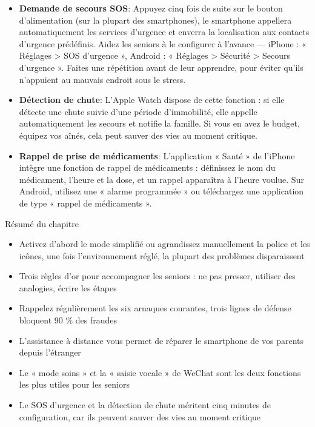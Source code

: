 
\begin{itemize}
  \item \textbf{Demande de secours SOS}: Appuyez cinq fois de suite sur le bouton d'alimentation (sur la plupart des smartphones), le smartphone appellera automatiquement les services d'urgence et enverra la localisation aux contacts d'urgence prédéfinis. Aidez les seniors à le configurer à l'avance — iPhone : « Réglages > SOS d'urgence », Android : « Réglages > Sécurité > Secours d'urgence ». Faites une répétition avant de leur apprendre, pour éviter qu'ils n'appuient au mauvais endroit sous le stress.
  \item \textbf{Détection de chute}: L'Apple Watch dispose de cette fonction : si elle détecte une chute suivie d'une période d'immobilité, elle appelle automatiquement les secours et notifie la famille. Si vous en avez le budget, équipez vos aînés, cela peut sauver des vies au moment critique.
  \item \textbf{Rappel de prise de médicaments}: L'application « Santé » de l'iPhone intègre une fonction de rappel de médicaments : définissez le nom du médicament, l'heure et la dose, et un rappel apparaîtra à l'heure voulue. Sur Android, utilisez une « alarme programmée » ou téléchargez une application de type « rappel de médicaments ».
\end{itemize}

\begin{tcbsummary}{Résumé du chapitre}
\begin{itemize}
  \item Activez d'abord le mode simplifié ou agrandissez manuellement la police et les icônes, une fois l'environnement réglé, la plupart des problèmes disparaissent
  \item Trois règles d'or pour accompagner les seniors : ne pas presser, utiliser des analogies, écrire les étapes
  \item Rappelez régulièrement les six arnaques courantes, trois lignes de défense bloquent 90 \% des fraudes
  \item L'assistance à distance vous permet de réparer le smartphone de vos parents depuis l'étranger
  \item Le « mode soins » et la « saisie vocale » de WeChat sont les deux fonctions les plus utiles pour les seniors
  \item Le SOS d'urgence et la détection de chute méritent cinq minutes de configuration, car ils peuvent sauver des vies au moment critique
\end{itemize}

\end{tcbsummary}
